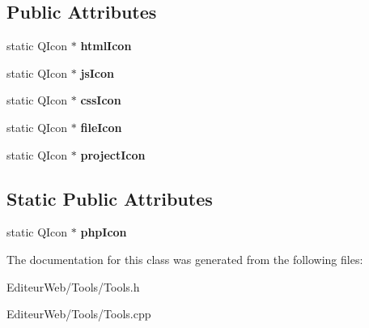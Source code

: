 \subsection*{Public Attributes}
\begin{DoxyCompactItemize}
\item 
\hypertarget{class_tools_a1461d6be0842e982349064ff55365074}{
static QIcon $\ast$ {\bfseries htmlIcon}}
\label{class_tools_a1461d6be0842e982349064ff55365074}

\item 
\hypertarget{class_tools_a9a1414c8896e0466e6cb3b59b96bb6ca}{
static QIcon $\ast$ {\bfseries jsIcon}}
\label{class_tools_a9a1414c8896e0466e6cb3b59b96bb6ca}

\item 
\hypertarget{class_tools_a0ece4acb7b243ce113d3b22725c6972f}{
static QIcon $\ast$ {\bfseries cssIcon}}
\label{class_tools_a0ece4acb7b243ce113d3b22725c6972f}

\item 
\hypertarget{class_tools_a4f0e551bdff4cdc41d30fec04a6ebf90}{
static QIcon $\ast$ {\bfseries fileIcon}}
\label{class_tools_a4f0e551bdff4cdc41d30fec04a6ebf90}

\item 
\hypertarget{class_tools_a139681d211ae81e5c94fc194992cea89}{
static QIcon $\ast$ {\bfseries projectIcon}}
\label{class_tools_a139681d211ae81e5c94fc194992cea89}

\end{DoxyCompactItemize}
\subsection*{Static Public Attributes}
\begin{DoxyCompactItemize}
\item 
\hypertarget{class_tools_aba3d7290b9b4320c99a71ddc7b976adb}{
static QIcon $\ast$ {\bfseries phpIcon}}
\label{class_tools_aba3d7290b9b4320c99a71ddc7b976adb}

\end{DoxyCompactItemize}


The documentation for this class was generated from the following files:\begin{DoxyCompactItemize}
\item 
EditeurWeb/Tools/Tools.h\item 
EditeurWeb/Tools/Tools.cpp\end{DoxyCompactItemize}
